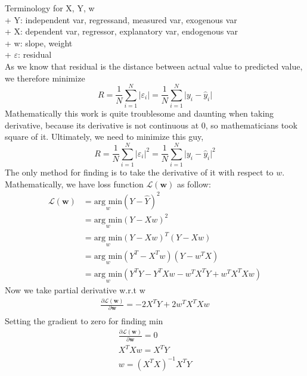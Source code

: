 \documentclass[12pt,a4paper]{article}
\begin{document}
\noindent Terminology for X, Y, w\\
+ Y: independent var, regressand, measured var, exogenous var\\
+ X: dependent var, regressor, explanatory var, endogenous var\\
+ w: slope, weight\\
+ $\varepsilon$: residual\\

\noindent As we know that residual is the distance between actual value to predicted value, we therefore minimize 
\[
R=
\frac{1}{N} \sum_{i=1}^{N} \vert \varepsilon_i\vert=
\frac{1}{N} \sum_{i=1}^{N} \vert y_i-\hat y_i\vert
\]
Mathematically this work is quite troublesome and daunting when taking derivative, because its derivative is not continuous at 0, so mathematicians took square of it. Ultimately, we need to minimize this guy,
\[
R=
\frac{1}{N} \sum_{i=1}^{N} \vert\varepsilon_i\vert^2=
\frac{1}{N} \sum_{i=1}^{N}\vert y_i-\hat y_i\vert^2
\]
The only method for finding is to take the derivative of it with respect to $w$. Mathematically, we have loss function $\mathcal{L}(\mathbf{w})$ as follow:\\
\begin{displaymath}
\begin{aligned}
\mathcal{L}(\mathbf{w})&={\underset w{\mbox{arg min}}} \left(Y-\hat{Y}\right)^2\\
&= {\underset w{\mbox{arg min}}} \left(Y-Xw\right)^2\\
&= {\underset w{\mbox{arg min}}} \left(Y-Xw\right)^T \left(Y-Xw\right)\\
&= {\underset w{\mbox{arg min}}} \left(Y^T-X^T w\right) \left(Y-w^T X\right) \\
&= {\underset w{\mbox{arg min}}} \left(Y^T Y - Y^TXw - w^TX^T Y + w^TX^TX w\right)
\end{aligned}
\end{displaymath}
Now we take partial derivative w.r.t w\\
\[
\begin{aligned}	
\frac{\partial{\mathcal{L}(\mathbf{w})}}{\partial{\mathbf{w}}}
= -2X^T Y + 2w^T X^T Xw\\
\end{aligned}
\]
Setting the gradient to zero for finding min
\[
\begin{aligned}	
\frac{\partial{\mathcal{L}(\mathbf{w})}}{\partial{\mathbf{w}}} = 0\\
X^TX w = X^T Y\\
w = \left(X^T X\right)^{-1} X^T Y
\end{aligned}
\]
\end{document}
